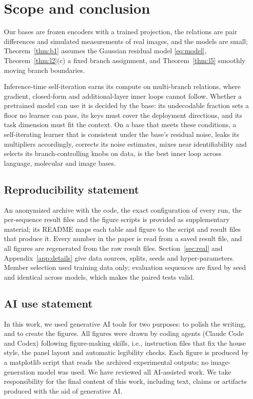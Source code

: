 \documentclass{article}
\theoremstyle{definition}
\theoremstyle{remark}
\begin{document}
\section{Scope and conclusion}

Our bases are frozen encoders with a trained projection, the relations are pair differences and simulated measurements of real images, and the models are small; Theorem~\ref{thm:b1} assumes the Gaussian residual model \eqref{eq:model}, Theorem~\ref{thm:l2}(c) a fixed branch assignment, and Theorem~\ref{thm:l5} smoothly moving branch boundaries.

Inference-time self-iteration earns its compute on multi-branch relations, where gradient, closed-form and additional-layer inner loops cannot follow.
Whether a pretrained model can use it is decided by the base: its undecodable fraction sets a floor no learner can pass, its keys must cover the deployment directions, and its task dimension must fit the context.
On a base that meets these conditions, a self-iterating learner that is consistent under the base's residual noise, leaks its multipliers accordingly, corrects its noise estimates, mixes near identifiability and selects its branch-controlling knobs on data, is the best inner loop across language, molecular and image bases.

\subsection*{Reproducibility statement}
An anonymized archive with the code, the exact configuration of every run, the per-sequence result files and the figure scripts is provided as supplementary material; its README maps each table and figure to the script and result files that produce it. Every number in the paper is read from a saved result file, and all figures are regenerated from the raw result files. Section~\ref{sec:real} and Appendix~\ref{app:details} give data sources, splits, seeds and hyper-parameters. Member selection used training data only; evaluation sequences are fixed by seed and identical across models, which makes the paired tests valid.

\subsection*{AI use statement}
In this work, we used generative AI tools for two purposes: to polish the writing, and to create the figures.
All figures were drawn by coding agents (Claude Code and Codex) following figure-making skills, i.e., instruction files that fix the house style, the panel layout and automatic legibility checks.
Each figure is produced by a matplotlib script that reads the archived experimental outputs; no image-generation model was used.
We have reviewed all AI-assisted work.
We take responsibility for the final content of this work, including text, claims or artifacts produced with the aid of generative AI.
\end{document}
